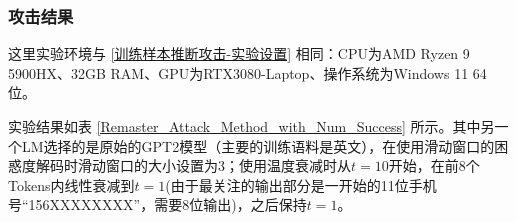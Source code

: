 %
%
%
%
%
%
%


\subsubsection{攻击结果} \label{Chap3_meminfer_setting}

这里实验环境与 \ref{训练样本推断攻击-实验设置} 相同：CPU为AMD Ryzen 9 5900HX、32GB RAM、GPU为RTX3080-Laptop、操作系统为Windows 11 64位。

实验结果如表 \ref{Remaster_Attack_Method_with_Num_Success} 所示。其中另一个LM选择的是原始的GPT2模型\cite{GPT2}（主要的训练语料是英文），在使用滑动窗口的困惑度解码时滑动窗口的大小设置为3；使用温度衰减时从$t=10$开始，在前8个Tokens内线性衰减到$t=1$(由于最关注的输出部分是一开始的11位手机号“156XXXXXXXX”，需要8位输出)，之后保持$t=1$。

